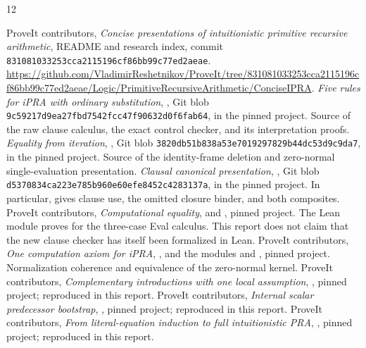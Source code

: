 \documentclass[11pt,letterpaper]{article}
\theoremstyle{definition}
\newcommand{\file}[1]{\texttt{\detokenize{#1}}}
\begin{document}
\clearpage
\begin{thebibliography}{12}
\small\raggedright
{}
ProveIt contributors, \emph{Concise presentations of intuitionistic
primitive recursive arithmetic}, README and research index,
commit \texttt{831081033253cca2115196cf86bb99c77ed2aeae}.
\url{https://github.com/VladimirReshetnikov/ProveIt/tree/831081033253cca2115196cf86bb99c77ed2aeae/Logic/PrimitiveRecursiveArithmetic/ConciseIPRA}.
\emph{Five rules for iPRA with ordinary substitution},
,
Git blob \texttt{9c59217d9ea27fbd7542fcc47f90632d0f6fab64},
in the pinned project. Source of the raw clause calculus,
the exact control checker, and its interpretation proofs.
\emph{Equality from iteration},
,
Git blob \texttt{3820db51b838a53e7019297829b44dc53d9c9da7},
in the pinned project. Source of the identity-frame deletion
and zero-normal single-evaluation presentation.
\emph{Clausal canonical presentation},
,
Git blob \texttt{d5370834ca223e785b960e60efe8452c4283137a},
in the pinned project. In particular, 
gives clause use, the omitted closure binder, and both composites.
ProveIt contributors, \emph{Computational equality},
 and
, pinned project.
The Lean module proves \file{eprf_iff_nprf} for the three-case
Eval calculus. This report does not claim that the new clause
checker has itself been formalized in Lean.
ProveIt contributors, \emph{One computation axiom for iPRA},
, and the modules
 and
, pinned project.
Normalization coherence and equivalence of the zero-normal kernel.
ProveIt contributors, \emph{Complementary introductions with one
local assumption},
,
pinned project; reproduced in this report.
ProveIt contributors, \emph{Internal scalar predecessor bootstrap},
,
pinned project; reproduced in this report.
ProveIt contributors, \emph{From literal-equation induction to full
intuitionistic PRA},
,
pinned project; reproduced in this report.

\end{thebibliography}
\end{document}
